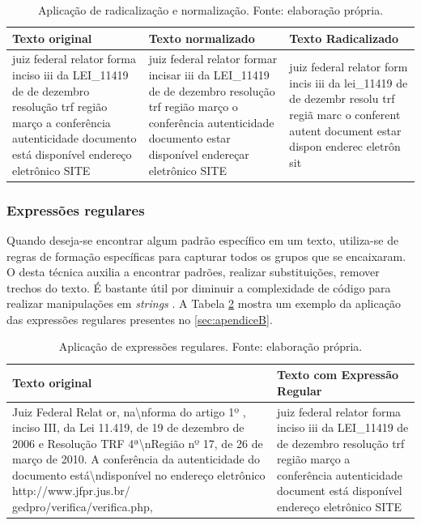 \begin{table}[h]
	\centering    
	\caption[Aplicação de radicalização e normalização]{Aplicação de radicalização e normalização. Fonte: elaboração própria.}
    \label{tab:radicalizacaoNormalizacao}
	\begin{tabular}{|p{4cm}|p{4cm}|p{4cm}|}
    \hline
    \textbf{Texto original} & \textbf{Texto normalizado} & \textbf{Texto Radicalizado} \\ \hline
	juiz federal relator forma inciso iii da LEI\_11419 de de dezembro resolução trf região março a conferência autenticidade documento está disponível endereço eletrônico SITE & juiz federal relator formar incisar iii da LEI\_11419 de de dezembro resolução trf região março o conferência autenticidade documento estar disponível endereçar eletrônico SITE & juiz federal relator form incis iii da lei\_11419 de de dezembr resolu trf regiã marc o conferent autent document estar dispon enderec eletrôn sit
    \\ \hline
    \end{tabular}
\end{table}

\subsubsection{Expressões regulares}

Quando deseja-se encontrar algum padrão específico em um texto, utiliza-se de regras de formação específicas para capturar todos os grupos que se encaixaram. O desta técnica auxilia a encontrar padrões, realizar substituições, remover trechos do texto. É bastante útil por diminuir a complexidade de código para realizar manipulações em \textit{strings} \cite{GOYUAERTS2012}. A Tabela \ref{tab:regex} mostra um exemplo da aplicação das expressões regulares presentes no \ref{sec:apendiceB}.

\begin{table}[h]
	\centering    
	\caption[Aplicação de expressões regulares]{Aplicação de expressões regulares. Fonte: elaboração própria.}
    \label{tab:regex}
	\begin{tabular}{|p{7cm}|p{7cm}|}
    \hline
    \textbf{Texto original} & \textbf{Texto com Expressão Regular} \\ \hline
	Juiz Federal Relat or, na\textbackslash nforma do artigo 1º , inciso III, da Lei 11.419, de 19 de dezembro de 2006 e Resolução TRF 4ª\textbackslash nRegião nº 17, de 26 de março de 2010. A conferência da autenticidade do documento está\textbackslash ndisponível no endereço eletrônico http://www.jfpr.jus.br/ gedpro/verifica/verifica.php, & juiz federal relator forma inciso iii da LEI\_11419 de de dezembro resolução trf região março a conferência autenticidade document está disponível endereço eletrônico SITE \\ \hline
    \end{tabular}
\end{table}

